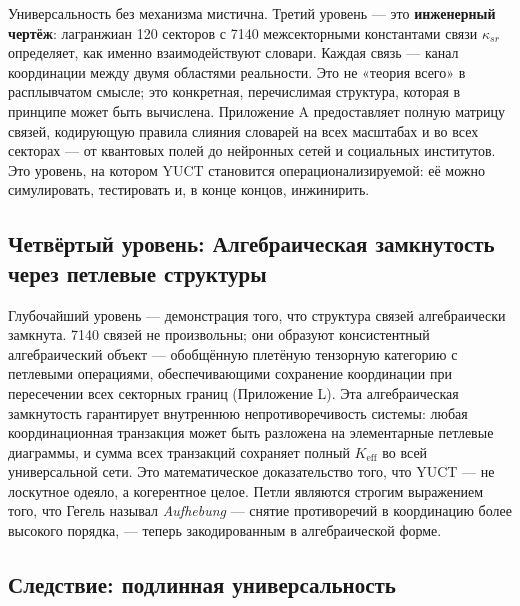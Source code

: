 \documentclass[12pt,a4paper]{article}
\begin{document}
	Универсальность без механизма мистична. Третий уровень — это \textbf{инженерный чертёж}: лагранжиан 120 секторов с 7140 межсекторными константами связи \(\kappa_{sr}\) определяет, как именно взаимодействуют словари. Каждая связь — канал координации между двумя областями реальности. Это не «теория всего» в расплывчатом смысле; это конкретная, перечислимая структура, которая в принципе может быть вычислена. Приложение A предоставляет полную матрицу связей, кодирующую правила слияния словарей на всех масштабах и во всех секторах — от квантовых полей до нейронных сетей и социальных институтов. Это уровень, на котором YUCT становится операционализируемой: её можно симулировать, тестировать и, в конце концов, инжинирить.
	
	\subsection{Четвёртый уровень: Алгебраическая замкнутость через петлевые структуры}
	
	Глубочайший уровень — демонстрация того, что структура связей алгебраически замкнута. 7140 связей не произвольны; они образуют консистентный алгебраический объект — обобщённую плетёную тензорную категорию с петлевыми операциями, обеспечивающими сохранение координации при пересечении всех секторных границ (Приложение L). Эта алгебраическая замкнутость гарантирует внутреннюю непротиворечивость системы: любая координационная транзакция может быть разложена на элементарные петлевые диаграммы, и сумма всех транзакций сохраняет полный \(K_{\mathrm{eff}}\) во всей универсальной сети. Это математическое доказательство того, что YUCT — не лоскутное одеяло, а когерентное целое. Петли являются строгим выражением того, что Гегель называл \emph{Aufhebung} — снятие противоречий в координацию более высокого порядка, — теперь закодированным в алгебраической форме.
	
	\subsection{Следствие: подлинная универсальность}
	
\end{document}
